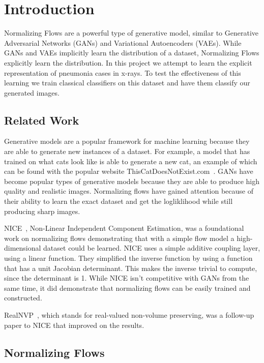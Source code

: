 \section{Introduction}
Normalizing Flows are a powerful type of generative model, similar to Generative
Adversarial Networks (GANs) and Variational Autoencoders (VAEs). While GANs and
VAEs implicitly learn the distribution of a dataset, Normalizing Flows
explicitly learn the distribution. In this project we attempt to learn the
explicit representation of pneumonia cases in x-rays. To test the effectiveness
of this learning we train classical classifiers on this dataset and have them
classify our generated images.

\subsection{Related Work}
Generative models are a popular framework for machine learning because they are
able to generate new instances of a dataset. For example, a model that has
trained on what cats look like is able to generate a new cat, an example of
which can be found with the popular website
ThisCatDoesNotExist.com~\cite{tcdne}. GANs have become popular types of
generative models because they are able to produce high quality and realistic
images. Normalizing flows have gained attention because of their ability to
learn the exact dataset and get the logliklihood while still producing sharp
images. 

NICE~\cite{nice}, Non-Linear Independent Component Estimation,  was a
foundational work on normalizing flows demonstrating that with a simple flow
model a high-dimensional dataset could be learned. NICE uses a simple additive
coupling layer, using a linear function. They simplified the inverse function by
using a function that has a unit Jacobian determinant. This makes the inverse
trivial to compute, since the determinant is 1. While NICE isn't competitive
with GANs from the same time, it did demonstrate that normalizing flows can be
easily trained and constructed.

RealNVP~\cite{realnvp}, which stands for real-valued non-volume preserving, was
a follow-up paper to NICE that improved on the results. 

\subsection{Normalizing Flows}
